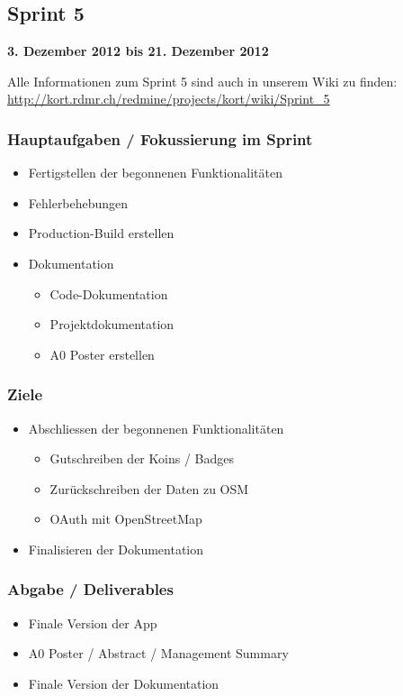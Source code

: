 \subsection{Sprint 5}

\textbf{3. Dezember 2012 bis 21. Dezember 2012}

Alle Informationen zum Sprint 5 sind auch in unserem Wiki zu finden:
\url{http://kort.rdmr.ch/redmine/projects/kort/wiki/Sprint_5}

\subsubsection{Hauptaufgaben / Fokussierung im Sprint}

\begin{itemize}
	\item Fertigstellen der begonnenen Funktionalitäten
	\item Fehlerbehebungen
	\item Production-Build erstellen
	\item Dokumentation
	\begin{itemize}
		\item Code-Dokumentation
		\item Projektdokumentation
		\item A0 Poster erstellen
	\end{itemize}
\end{itemize}

\subsubsection{Ziele}
\begin{itemize}
	\item Abschliessen der begonnenen Funktionalitäten
	\begin{itemize}
		\item Gutschreiben der Koins / Badges
		\item Zurückschreiben der Daten zu OSM
		\item OAuth mit OpenStreetMap
	\end{itemize}
	\item Finalisieren der Dokumentation
\end{itemize}

\subsubsection{Abgabe / Deliverables}

\begin{itemize}
	\item Finale Version der App
	\item A0 Poster / Abstract / Management Summary
	\item Finale Version der Dokumentation
\end{itemize}

